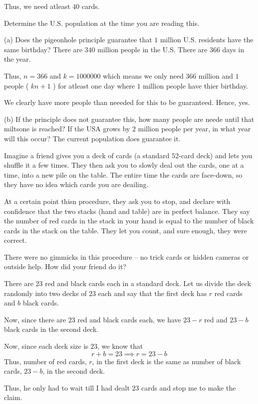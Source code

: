 		Thus, we need atleast $40$ cards.
	\es
\ep 


\bp 
	Determine the U.S. population at the time you are reading this.
	
	(a) Does the pigeonhole principle guarantee that $1$ million U.S.  residents have the same birthday?
	\bs
		There are $340$ million people in the U.S. There are $366$ days in the year.

		Thus, $n = 366$ and $k = 1000000$ which means we only need $366$ million and $1$ people ( $kn+1$ ) for atleast one day where $1$ million people have thier birthday.

		We clearly have more people than neeeded for this to be guaranteed. Hence, yes.
	\es


	(b) If the principle does not guarantee this, how many people are neede until that miltsone is reached? If the USA grows by $2$ million people per year, in what year will this occur?
	\bs The current population does guarantee it. \es
\ep 


\bp 
Imagine a friend gives you a deck of cards (a standard $52$-card deck) and lets you shuffle it a few times. They then ask you to slowly deal out the cards, one at a time, into a new pile on the table. The entire time the cards are face-down, so they have no idea which cards you are deailing.

At a certain point thisn procedure, they ask you to stop, and declare with confidence that the two stacks (hand and table) are in perfect balance.
They say the number of red cards in the stack in your hand is equal to the number of black cards in the stack on the table.
They let you count, and sure enough, they were correct.

There were no gimmicks in this procedure -- no trick cards or hidden cameras or outside help. How did your friend do it?
\ep 

\bs
	There are $23$ red and black cards each in a standard deck. 
	Let us divide the deck randomly into two decks of $23$ each and say that the first deck has $r$ red cards and $b$ black cards.

	Now, since there are $23$ red and black cards each, we have $23-r$ red and $23-b$ black cards in the second deck.

	Now, since each deck size is $23$, we know that 
	$$r + b = 23 \implies r = 23 - b$$
	Thus, number of red cards, $r$, in the first deck is the same as number of black cards, $23-b$, in the second deck.

	Thus, he only had to wait till I had dealt $23$ cards and stop me to make the claim.
\es

